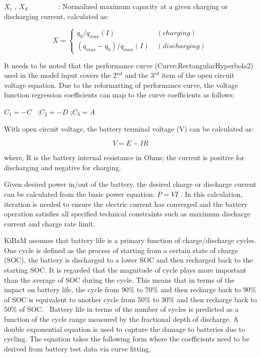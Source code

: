 \({X_c}\) , \({X_d}\) ~~~~~~~~: Normalized maximum capacity at a given charging or discharging current, calculated as:

\begin{equation}
X = \left\{
    \begin{array}{cl}
      q_0 / q_{max}(I) & \; (charging) \\
      (q_{max}-q_0)/q_{max}(I) & \; (discharging)
    \end{array}
  \right.
\end{equation}

It needs to be noted that the performance curve (Curve:RectangularHyperbola2) used in the model input covers the 2\(^{nd}\) and the 3\(^{rd}\) item of the open circuit voltage equation. Due to the reformatting of performance curve, the voltage function regression coefficients can map to the curve coefficients as follows:

\({C_1} = - C\) ~;\({C_2} = - D\) ;\({C_3} = A\)

With open circuit voltage, the battery terminal voltage (V) can be calculated as:

\begin{equation}
V = E - IR
\end{equation}

where, R is the battery internal resistance in Ohms; the current is positive for discharging and negative for charging.

Given desired power in/out of the battery, the desired charge or discharge current can be calculated from the basic power equation: \(P = VI\) . In this calculation, iteration is needed to ensure the electric current has converged and the battery operation satisfies all specified technical constraints such as maximum discharge current and charge rate limit.

KiBaM assumes that battery life is a primary function of charge/discharge cycles. One cycle is defined as the process of starting from a certain state of charge (SOC), the battery is discharged to a lower SOC and then recharged back to the starting SOC. It is regarded that the magnitude of cycle plays more important than the average of SOC during the cycle. This means that in terms of the impact on battery life, the cycle from 90\% to 70\% and then recharge back to 90\% of SOC is equivalent to another cycle from 50\% to 30\% and then recharge back to 50\% of SOC.~ Battery life in terms of the number of cycles is predicted as a function of the cycle range measured by the fractional depth of discharge. A double exponential equation is used to capture the damage to batteries due to cycling. The equation takes the following form where the coefficients need to be derived from battery test data via curve fitting.

